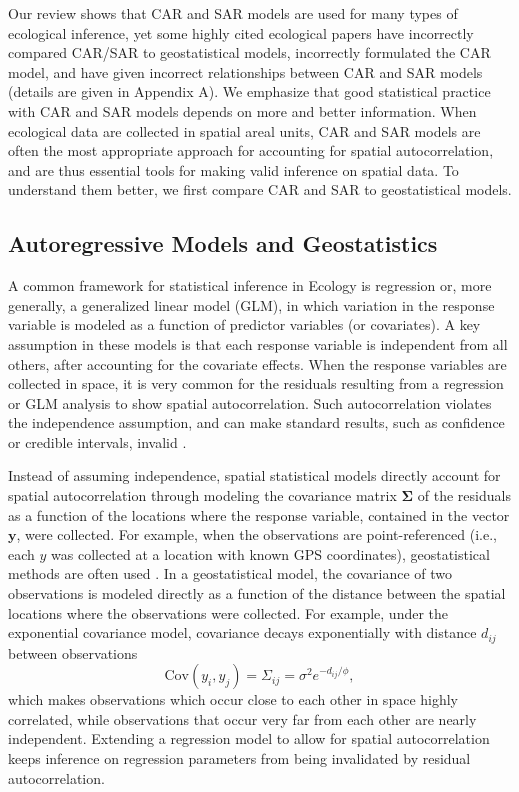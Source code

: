 \documentclass[11pt, titlepage]{article}\usepackage[]{graphicx}\usepackage[]{color}
\begin{document}
\begin{spacing}{1.9}
\begin{flushleft}
Our review shows that CAR and SAR models are used for many types of ecological inference, yet some highly cited ecological papers have incorrectly compared CAR/SAR to geostatistical models, incorrectly formulated the CAR model, and have given incorrect relationships between CAR and SAR models (details are given in Appendix A). We emphasize that good statistical practice with CAR and SAR models depends on more and better information.  When ecological data are collected in spatial areal units, CAR and SAR models are often the most appropriate approach for accounting for spatial autocorrelation, and are thus essential tools for making valid inference on spatial data.   To understand them better, we first compare CAR and SAR to geostatistical models.

\subsection*{Autoregressive Models and Geostatistics}

A common framework for statistical inference in Ecology is regression or, more generally, a generalized linear model (GLM), in which variation in the response variable is modeled as a function of predictor variables (or covariates).  A key assumption in these models is that each response variable is independent from all others, after accounting for the covariate effects.  When the response variables are collected in space, it is very common for the residuals resulting from a regression or GLM analysis to show spatial autocorrelation.  Such autocorrelation violates the independence assumption, and can make standard results, such as confidence or credible intervals, invalid \citep{Clif:Ord:spat:1981,Lege:spat:1993}. 

Instead of assuming independence, spatial statistical models directly account for spatial autocorrelation through modeling the covariance matrix $\boldsymbol\Sigma$ of the residuals as a function of the locations where the response variable, contained in the vector $\mathbf{y}$, were collected.  For example, when the observations are point-referenced (i.e., each $y$ was collected at a location with known GPS coordinates), geostatistical methods are often used \citep[e.g.,][]{Turn:ONei:Conl:Conl:Hump:patt:1991}.  In a geostatistical model, the covariance of two observations is modeled directly as a function of the distance between the spatial locations where the observations were collected.  For example, under the exponential covariance model, covariance decays exponentially with distance $d_{ij}$ between observations
\begin{equation} \label{eq:expGeo}
  \text{Cov}(y_i,y_j)=\Sigma_{ij}=\sigma^2e^{-d_{ij}/\phi},
\end{equation}
which makes observations which occur close to each other in space highly correlated, while observations that occur very far from each other are nearly independent.  Extending a regression model to allow for spatial autocorrelation \citep[e.g.,][]{Ver:Cres:Fish:Case:unce:2001} keeps inference on regression parameters from being invalidated by residual autocorrelation.


\end{flushleft}
\end{spacing}
\end{document}
